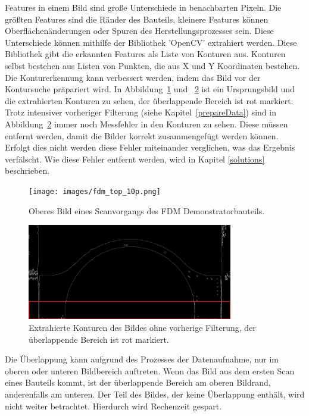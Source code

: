Features in einem Bild sind große Unterschiede in benachbarten Pixeln. Die größten
Features sind die Ränder des Bauteils, kleinere Features können Oberflächenänderungen 
oder Spuren des Herstellungsprozesses sein. Diese Unterschiede können mithilfe 
der Bibliothek 'OpenCV' extrahiert werden. Diese Bibliothek gibt die erkannten 
Features als Liste von Konturen aus. Konturen selbst bestehen aus Listen von 
Punkten, die aus X und Y Koordinaten bestehen. Die Konturerkennung kann verbessert 
werden, indem das Bild vor der Kontursuche präpariert wird. In Abbildung~\ref{fig:image_top} und
~\ref{fig:cons} ist ein Ursprungsbild und die extrahierten Konturen zu sehen, 
der überlappende Bereich ist rot markiert.
Trotz intensiver vorheriger Filterung (siehe Kapitel~\ref{prepareData}) sind in 
Abbildung~\ref{fig:cons} immer noch Messfehler in den Konturen zu sehen. 
Diese müssen entfernt werden, damit die Bilder 
korrekt zusammengefügt werden können. Erfolgt dies nicht werden diese Fehler miteinander
verglichen, was das Ergebnis verfälscht. Wie diese Fehler entfernt werden, 
wird in Kapitel \ref{solutions} beschrieben.

\begin{figure}[h]
    \centering
    \texttt{[image: images/fdm\_top\_10p.png]} %
    \caption{Oberes Bild eines Scanvorgangs des FDM Demonstratorbauteils.}
    \label{fig:image_top}
\end{figure}

\begin{figure}[h]
    \centering
    \includegraphics[width=0.8\textwidth]{images/contours_of_image.png} %
    \caption{Extrahierte Konturen des Bildes ohne vorherige Filterung, 
    der überlappende Bereich ist rot markiert.}
    \label{fig:cons}
\end{figure}

Die Überlappung kann aufgrund des Prozesses der Datenaufnahme, 
nur im oberen oder unteren Bildbereich auftreten. Wenn das Bild 
aus dem ersten Scan eines Bauteils kommt, ist der überlappende Bereich am 
oberen Bildrand, anderenfalls am unteren. 
Der Teil des Bildes, der keine Überlappung enthält, wird nicht weiter betrachtet. 
Hierdurch wird Rechenzeit gespart.

